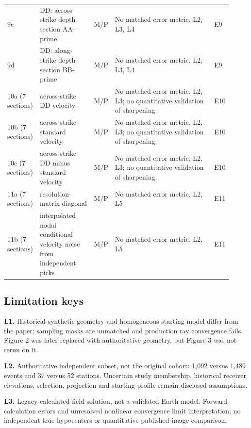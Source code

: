 \begin{longtable}{@{}p{0.115\linewidth}p{0.245\linewidth}p{0.06\linewidth}p{0.445\linewidth}p{0.055\linewidth}@{}}
9c & DD: across-strike depth section AA-prime & M/P & No matched error metric. L2, L3, L4 & E9\\[3pt]

9d & DD: along-strike depth section BB-prime & M/P & No matched error metric. L2, L3, L4 & E9\\[3pt]

10a (7 sections) & across-strike DD velocity & M/P & No matched error metric. L2, L3; no quantitative validation of sharpening. & E10\\[3pt]

10b (7 sections) & across-strike standard velocity & M/P & No matched error metric. L2, L3; no quantitative validation of sharpening. & E10\\[3pt]

10c (7 sections) & across-strike DD minus standard velocity & M/P & No matched error metric. L2, L3; no quantitative validation of sharpening. & E10\\[3pt]

11a (7 sections) & resolution-matrix diagonal & M/P & No matched error metric. L2, L5 & E11\\[3pt]

11b (7 sections) & interpolated nodal conditional velocity noise from independent picks & M/P & No matched error metric. L2, L5 & E11\\[3pt]

\bottomrule\end{longtable}\normalsize

\subsection*{Limitation keys}

\noindent\textbf{L1.} Historical synthetic geometry and homogeneous starting model differ from the paper; sampling masks are unmatched and production ray convergence fails. Figure 2 was later replaced with authoritative geometry, but Figure 3 was not rerun on it.\par\smallskip

\noindent\textbf{L2.} Authoritative independent subset, not the original cohort: 1,092 versus 1,489 events and 37 versus 52 stations. Uncertain study membership, historical receiver elevations, selection, projection and starting profile remain disclosed assumptions.\par\smallskip

\noindent\textbf{L3.} Legacy calculated field solution, not a validated Earth model. Forward-calculation errors and unresolved nonlinear convergence limit interpretation; no independent true hypocenters or quantitative published-image comparison.\par\smallskip

